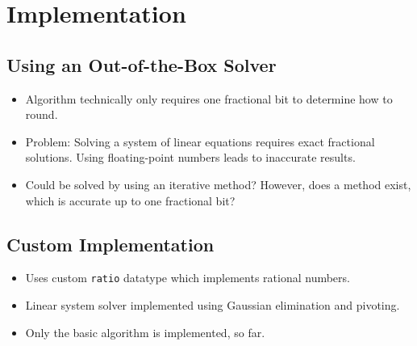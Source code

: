 \documentclass[english,version-2020-11]{uzl-thesis}
\begin{document}
\chapter{Implementation}

\section{Using an Out-of-the-Box Solver}

\begin{itemize}
  \item Algorithm technically only requires one fractional bit to determine how to round.
  \item Problem: Solving a system of linear equations requires exact fractional solutions.
    Using floating-point numbers leads to inaccurate results.
  \item Could be solved by using an iterative method? However, does a method
    exist, which is accurate up to one fractional bit?
\end{itemize}

\section{Custom Implementation}

\begin{itemize}
  \item Uses custom \texttt{ratio} datatype which implements rational numbers.
  \item Linear system solver implemented using Gaussian elimination and pivoting.
  \item Only the basic algorithm is implemented, so far.
\end{itemize}

\begin{bibtex-entries}
\end{bibtex-entries}
\end{document}
